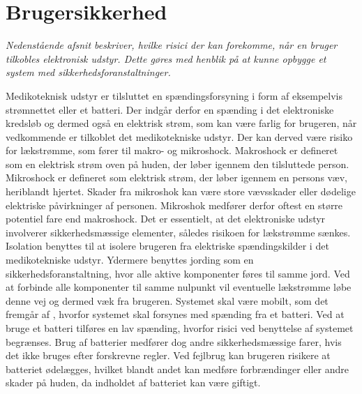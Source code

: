 \section{Brugersikkerhed}
\textit{Nedenstående afsnit beskriver, hvilke risici der kan forekomme, når en bruger tilkobles elektronisk udstyr. Dette gøres med henblik på at kunne opbygge et system med sikkerhedsforanstaltninger.}

Medikoteknisk udstyr er tilsluttet en spændingsforsyning i form af eksempelvis strømnettet eller et batteri. Der indgår derfor en spænding i det elektroniske kredsløb og dermed også en elektrisk strøm, som kan være farlig for brugeren, når vedkommende er tilkoblet det medikotekniske udstyr. Der kan derved være risiko for lækstrømme, som fører til makro- og mikroshock. Makroshock er defineret som en elektrisk strøm oven på huden, der løber igennem den tilsluttede person. Mikroshock er defineret som elektrisk strøm, der løber igennem en persons væv, heriblandt hjertet. Skader fra mikroshok kan være store vævsskader eller dødelige elektriske påvirkninger af personen. Mikroshok medfører derfor oftest en større potentiel fare end makroshock. \citep{Webster2011} \newline
Det er essentielt, at det elektroniske udstyr involverer sikkerhedsmæssige elementer, således risikoen for lækstrømme sænkes. Isolation benyttes til at isolere brugeren fra elektriske spændingskilder i det medikotekniske udstyr. Ydermere benyttes jording som en sikkerhedsforanstaltning, hvor alle aktive komponenter føres til samme jord. Ved at forbinde alle komponenter til samme nulpunkt vil eventuelle lækstrømme løbe denne vej og dermed væk fra brugeren. \citep{Webster2011} \newline 
Systemet skal være mobilt, som det fremgår af , hvorfor systemet skal forsynes med spænding fra et batteri. Ved at bruge et batteri tilføres en lav spænding, hvorfor risici ved benyttelse af systemet begrænses. Brug af batterier medfører dog andre sikkerhedsmæssige farer, hvis det ikke bruges efter forskrevne regler. Ved fejlbrug kan brugeren risikere at batteriet ødelægges, hvilket blandt andet kan medføre forbrændinger eller andre skader på huden, da indholdet af batteriet kan være giftigt. \citep{NREL2011}